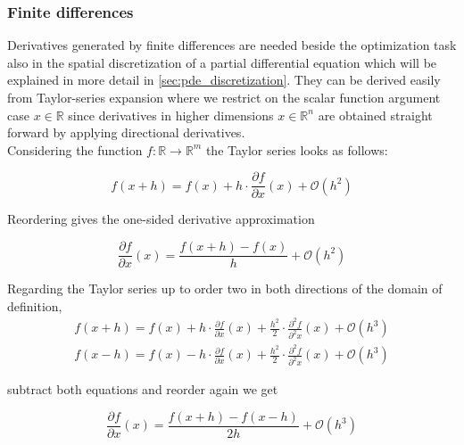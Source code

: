 \documentclass{scrartcl}[12pt, halfparskip]
\numberwithin{equation}{section}
\numberwithin{figure}{section}
\numberwithin{table}{section}
\begin{document}
\subsubsection{Finite differences}
\label{sec:finite_differences}
Derivatives generated by finite differences are needed beside the optimization task also in the spatial discretization of a partial differential equation which will be explained in more detail in \cref{sec:pde_discretization}.
They can be derived easily from Taylor-series expansion where we restrict on the scalar function argument case $x \in \mathbb{R}$ since derivatives in higher dimensions $x \in \mathbb{R}^n$ are obtained straight forward by applying directional derivatives. \\
Considering the function $f: \mathbb{R} \rightarrow \mathbb{R}^m$ the Taylor series looks as follows:


\begin{equation}
f(x+h) = f(x) + h \cdot \frac{\partial f}{\partial x}(x) + \mathcal{O}(h^2)
\end{equation}

Reordering gives the one-sided derivative approximation

\begin{equation}
\frac{\partial f}{\partial x}(x) = \frac{f(x+h) - f(x)}{h} + \mathcal{O}(h^2)
\label{eq:one_sided_discretized_derivative}
\end{equation}

Regarding the Taylor series up to order two in both directions of the domain of definition,
\begin{subequations}
	\label{eq:finite_differences_taylor_exp}
	\begin{align}
	f(x+h) = f(x) + h \cdot \frac{\partial f}{\partial x}(x) + \frac{h^2}{2} \cdot \frac{\partial^2 f}{\partial^2 x}(x) + \mathcal{O}(h^3) \label{eq:finite_differences_taylor_exp_+} \\
	f(x-h) = f(x) - h \cdot \frac{\partial f}{\partial x}(x) + \frac{h^2}{2} \cdot \frac{\partial^2 f}{\partial^2 x}(x) + \mathcal{O}(h^3)  \label{eq:finite_differences_taylor_exp_-}	
	\end{align}
\end{subequations}


subtract both equations and reorder again we get

\begin{equation}
\frac{\partial f}{\partial x}(x) = \frac{f(x+h) - f(x-h)}{2 h} + \mathcal{O}(h^3)
\end{equation}
\end{document}
